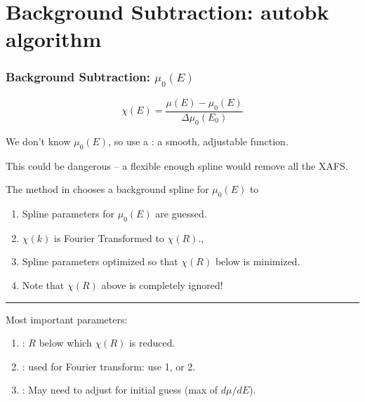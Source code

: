 \section{Background Subtraction: autobk algorithm}


\begin{frame} \frametitle{Background Subtraction: $\mu_0(E)$}

\begin{cenpage}{130mm}

  \[ \chi(E) = \frac{\mu(E) - \mu_0(E)}{\Delta \mu_0(E_0)} \]

\vmm
We don't know ${\mu_0(E)}$, so use a {}: a smooth, adjustable function.

\vmm

This could be dangerous -- a flexible enough spline would remove all the XAFS.

\vmm
\pause

The {\autobk} method in {\larch} chooses a background spline for $\mu_0(E)$ to

\begin{center}
  \begin{postitbox}{55mm}
    {}
  \end{postitbox}
\end{center}

\begin{enumerate}
  \item Spline parameters for $\mu_0(E)$ are guessed.
  \item $\chi(k)$ is Fourier Transformed to $\chi(R)$.,
  \item Spline parameters optimized so that $\chi(R)$ below  is minimized.
  \item Note that $\chi(R)$ above  is completely ignored!
\end{enumerate}


\vmm  \hrule \vmm

Most important parameters:

\begin{enumerate}
\item {}: $R$ below which $\chi(R)$ is reduced.
\item {}:  used for Fourier transform:   use 1, or 2.
\item {}:         May need to adjust for initial guess (max of $d\mu/dE$).
\end{enumerate}

\end{cenpage}
\end{frame}


